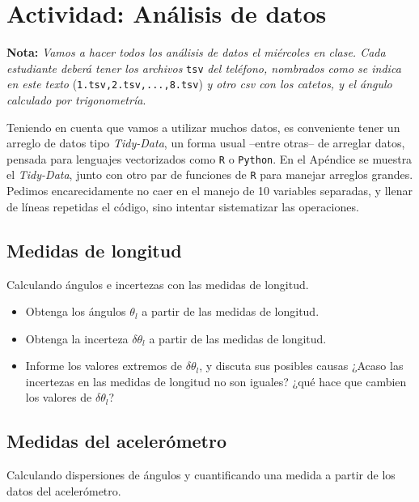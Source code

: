 \documentclass[10pt,a4paper]{article}
\theoremstyle{definition}
\begin{document}
\section{Actividad: Análisis de datos}

\begin{small}
\textbf{Nota:} \emph{Vamos a hacer todos los análisis de datos el miércoles en clase. Cada estudiante deberá tener los archivos} \texttt{tsv} \emph{del teléfono, nombrados como se indica en este texto} (\texttt{1.tsv,2.tsv,...,8.tsv}) \emph{y otro csv con los catetos, y el ángulo calculado por trigonometría}.
\end{small}

Teniendo en cuenta que vamos a utilizar muchos datos, es conveniente tener un arreglo de datos tipo \textit{Tidy-Data}, un forma usual --entre otras-- de arreglar datos, pensada para lenguajes vectorizados como \texttt{R} o \texttt{Python}. En el Apéndice se muestra el \textit{Tidy-Data}, junto con otro par de funciones de \texttt{R} para manejar arreglos grandes. Pedimos encarecidamente no caer en el manejo de 10 variables separadas, y llenar de líneas repetidas el código, sino intentar sistematizar las operaciones. 

\subsection{Medidas de longitud}

Calculando ángulos e incertezas con las medidas de longitud.

\begin{itemize}
\item[a)] Obtenga los ángulos $\theta_{l}$ a partir de las medidas de longitud.
\item[b)] Obtenga la incerteza $\delta \theta_{l}$ a partir de las medidas de longitud.
\item[c)] Informe los valores extremos de $\delta \theta_l$, y discuta sus posibles causas ¿Acaso las incertezas en las medidas de longitud no son iguales? ¿qué hace que cambien los valores de $\delta \theta_l$? 
\end{itemize}


\subsection{Medidas del acelerómetro}

Calculando dispersiones de ángulos y cuantificando una medida a partir de los datos del acelerómetro.
\end{document}
